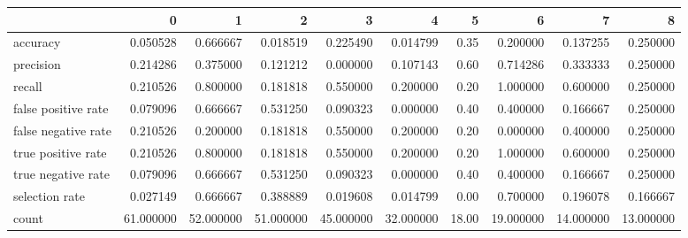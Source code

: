 \begin{tabular}{lrrrrrrrrr}
\toprule
{} &          0 &          1 &          2 &          3 &          4 &      5 &          6 &          7 &          8 \\
\midrule
accuracy            &   0.050528 &   0.666667 &   0.018519 &   0.225490 &   0.014799 &   0.35 &   0.200000 &   0.137255 &   0.250000 \\
precision           &   0.214286 &   0.375000 &   0.121212 &   0.000000 &   0.107143 &   0.60 &   0.714286 &   0.333333 &   0.250000 \\
recall              &   0.210526 &   0.800000 &   0.181818 &   0.550000 &   0.200000 &   0.20 &   1.000000 &   0.600000 &   0.250000 \\
false positive rate &   0.079096 &   0.666667 &   0.531250 &   0.090323 &   0.000000 &   0.40 &   0.400000 &   0.166667 &   0.250000 \\
false negative rate &   0.210526 &   0.200000 &   0.181818 &   0.550000 &   0.200000 &   0.20 &   0.000000 &   0.400000 &   0.250000 \\
true positive rate  &   0.210526 &   0.800000 &   0.181818 &   0.550000 &   0.200000 &   0.20 &   1.000000 &   0.600000 &   0.250000 \\
true negative rate  &   0.079096 &   0.666667 &   0.531250 &   0.090323 &   0.000000 &   0.40 &   0.400000 &   0.166667 &   0.250000 \\
selection rate      &   0.027149 &   0.666667 &   0.388889 &   0.019608 &   0.014799 &   0.00 &   0.700000 &   0.196078 &   0.166667 \\
count               &  61.000000 &  52.000000 &  51.000000 &  45.000000 &  32.000000 &  18.00 &  19.000000 &  14.000000 &  13.000000 \\
\bottomrule
\end{tabular}
